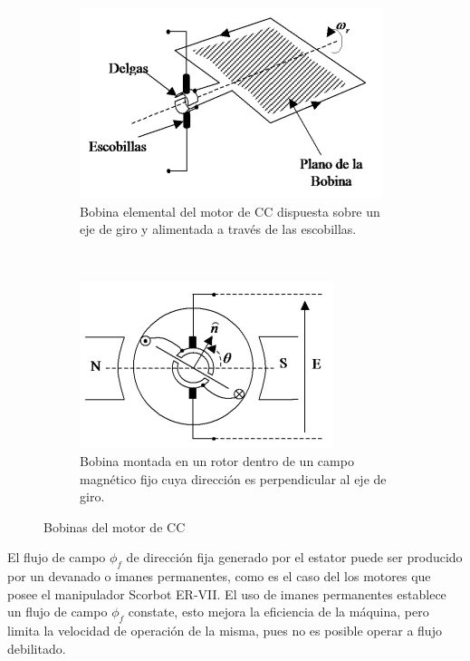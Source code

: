 \begin{figure}[H]
    \centering
    \begin{subfigure}[b]{0.48\textwidth}
            \includegraphics[width=\textwidth]{img/cap2/motor_cc1.png}
            \caption{Bobina elemental del motor de CC dispuesta sobre un eje de giro y alimentada a través de las escobillas.}
    \end{subfigure}
    ~
    \begin{subfigure}[b]{0.48\textwidth}
            \includegraphics[width=\textwidth]{img/cap2/motor_cc2.png}
            \caption{Bobina montada en un rotor dentro de un campo magnético fijo cuya dirección es perpendicular al eje de giro.}
    \end{subfigure}
    \caption{Bobinas del motor de CC}
    \label{cap2_motorcc}
\end{figure}


El flujo de campo $\phi_f$ de dirección fija generado por el estator puede ser producido por un devanado o imanes permanentes, como es el caso del los motores que posee el manipulador Scorbot ER-VII. El uso de imanes permanentes establece un flujo de campo $\phi_f$ constate, esto mejora la eficiencia de la máquina, pero limita la velocidad de operación de la misma, pues no es posible operar a flujo debilitado.

